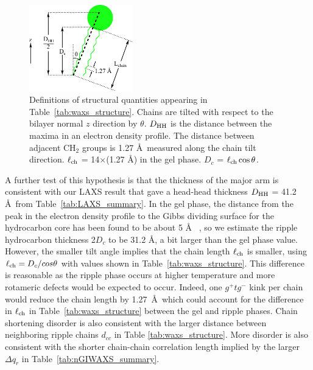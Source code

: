 \begin{figure}[htbp]
  \centering
  \includegraphics[width=0.4\textwidth]{figures/ripple/thin_rod_model/chain_length}
  \caption{Definitions of structural quantities appearing in Table~\ref{tab:waxs_structure}. 
  Chains are tilted with respect
  to the bilayer normal $z$ direction by $\theta$. $D_\textrm{HH}$ is the distance
  between the maxima in an electron density profile. 
  The distance between adjacent CH$_2$ groups
  is 1.27 \AA\ measured along the chain tilt direction. 
  $\ell_\text{ch}$ = 14$\times$(1.27 \AA) in the gel phase.
  $D_c$ = $\ell_\text{ch}\cos\theta$.}
  \label{fig:chain_length}
\end{figure}

A further test of this hypothesis is that the thickness of the major arm is 
consistent with our LAXS result that gave a head-head thickness 
$D_\textrm{HH}$ = 41.2 \AA\ from Table~\ref{tab:LAXS_summary}. In the gel phase, the 
distance from the peak in the electron density profile to the Gibbs dividing 
surface for the hydrocarbon core has been found to be about 5 \AA
~\cite{Tristram-Nagle02}, so we estimate the ripple hydrocarbon thickness 
2$D_c$ to be 31.2 \AA, a bit larger than the gel phase value. However, the 
smaller tilt angle implies that the chain length $\ell_\text{ch}$ is smaller, using 
$\ell_\text{ch}=D_c/cos{\theta}$ with values shown in Table~\ref{tab:waxs_structure}.  
This difference is reasonable as the ripple phase occurs at higher temperature 
and more rotameric defects would be expected to occur.  Indeed, one 
$g^+tg^-$ kink per chain would reduce the chain length by 1.27~\AA\ which could
account for the difference in $\ell_\text{ch}$ in Table~\ref{tab:waxs_structure}
between the gel and ripple phases.  
Chain shortening disorder is also consistent with the larger distance 
between neighboring ripple chains $d_{cc}$ in Table \ref{tab:waxs_structure}.  
More disorder is also consistent with the shorter chain-chain correlation 
length implied by the larger ${\Delta}q_r$ in Table~\ref{tab:nGIWAXS_summary}.

